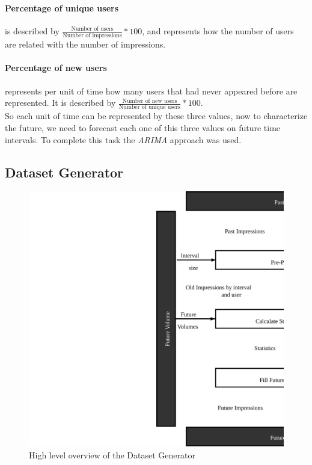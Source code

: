 \paragraph{Percentage of unique users}
is described by $\frac{\text{Number of users}}{\text{Number of impressions}}
* 100$, and represents how the number of users are related with the number of
impressions.

\paragraph{Percentage of new users}
represents per unit of time how many users that had never appeared before are
represented. It is described by $\frac{\text{Number of new users}}{\text{Number
of unique users}}*100$.
\\

So each unit of time can be represented by these three values, now to
characterize the future, we need to forecast each one of this three values
on future time intervals. To complete this task the \emph{ARIMA} approach was used.



\subsection{Dataset Generator}

\begin{figure}[h] \begin{center} \leavevmode
\includegraphics[]{high_level_file_gen} \caption{ High level overview
of the Dataset Generator } \label{fig:highlevel_arch_file_gen} \end{center} \end{figure}

